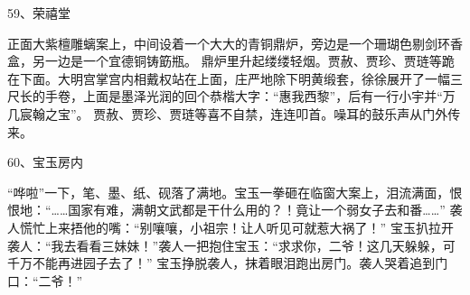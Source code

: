 59、荣禧堂\par
正面大紫檀雕螭案上，中间设着一个大大的青铜鼎炉，旁边是一个珊瑚色剔剑环香盒，另一边是一个宜德铜铸筯瓶。
鼎炉里升起缕缕轻烟。贾赦、贾珍、贾琏等跪在下面。大明宫掌宫内相戴权站在上面，庄严地除下明黄缎套，徐徐展开了一幅三尺长的手卷，上面是墨泽光润的回个恭楷大字：“惠我西黎”，后有一行小宇并“万几宸翰之宝”。
贾赦、贾珍、贾琏等喜不自禁，连连叩首。噪耳的鼓乐声从门外传来。

60、宝玉房内\par
“哗啦”一下，笔、墨、纸、砚落了满地。宝玉一拳砸在临窗大案上，泪流满面，恨恨地：“……国家有难，满朝文武都是干什么用的？！竟让一个弱女子去和番……”
袭人慌忙上来捂他的嘴：“别嚷嚷，小祖宗！让人听见可就惹大祸了！”
宝玉扒拉开袭人：“我去看看三妹妹！”袭人一把抱住宝玉：“求求你，二爷！这几天躲躲，可千万不能再进园子去了！”
宝玉挣脱袭人，抹着眼泪跑出房门。袭人哭着追到门口：“二爷！”


